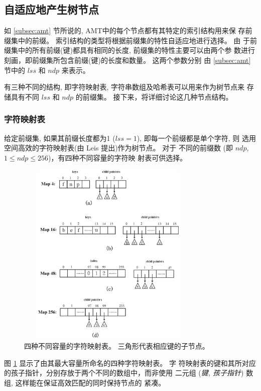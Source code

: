 \subsection{自适应地产生树节点}
\label{subsec:nodes}

如 \ref{subsec:amt} 节所说的, AMT中的每个节点都有其特定的索引结构用来保
存前缀集中的前缀。 索引结构的类型将根据前缀集的特性自适应地进行选择。 由
于前缀集中的所有前缀(键)都具有相同的长度, 前缀集的特性主要可以由两个参
数进行刻画，即前缀集所包含前缀(键)的长度和数量。 这两个参数分别
由 \ref{subsec:amt} 节中的 $lss$ 和 $ndp$ 来表示。

有三种不同的结构, 即字符映射表, 字符串数组及哈希表可以用来作为树节点来
存储具有不同 $lss$ 和 $ndp$ 的前缀集。 接下来，将详细讨论这几种节点结构。

\noindent\subsubsection{字符映射表}

给定前缀集, 如果其前缀长度都为1 ($lss=1$), 即每一个前缀都是单个字符, 则
选用空间高效的字符映射表(由 Leis \cite{Leis2013} 提出)作为树节点。 对于
不同的前缀数 (即 $ndp$, $1 \leq ndp \leq 256$)，有四种不同容量的字符映
射表可供选择。

\begin{figure}[hp]
  \centering
  \includegraphics[height=3.5in, width=3.5in]{figures/2_MPM/Maps}
  \caption{四种不同容量的字符映射表。 三角形代表相应键的子节点。}
  \label{fig:character map}
\end{figure}

图 \ref{fig:character map} 显示了由其最大容量所命名的四种字符映射表。 字
符映射表的键和其所对应的孩子指针，分别存放于两个不同的数组中，而非使用
二元组 (\emph{键, 孩子指针}) 数组, 这样能在保证高效匹配的同时保持节点的
紧凑。

